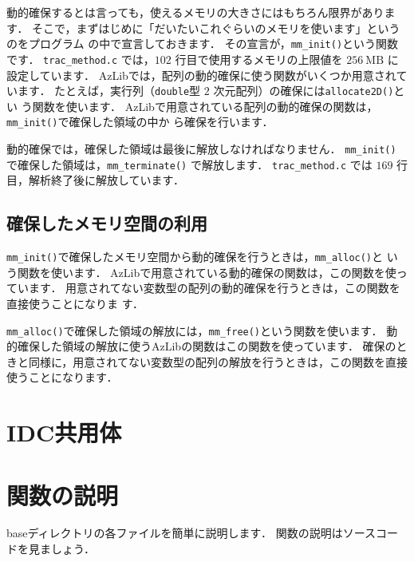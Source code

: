 動的確保するとは言っても，使えるメモリの大きさにはもちろん限界があります．
そこで，まずはじめに「だいたいこれぐらいのメモリを使います」というのをプログラム
の中で宣言しておきます．
その宣言が，\verb|mm_init()|という関数です．
\verb|trac_method.c| では，$102$ 行目で使用するメモリの上限値を 
$256 \ \mathrm{MB}$ に設定しています．
AzLibでは，配列の動的確保に使う関数がいくつか用意されています．
たとえば，実行列（\verb|double|型 $2$ 次元配列）の確保には\verb|allocate2D()|とい
う関数を使います．
AzLibで用意されている配列の動的確保の関数は，\verb|mm_init()|で確保した領域の中か
ら確保を行います．

動的確保では，確保した領域は最後に解放しなければなりません．
\verb|mm_init()| で確保した領域は，\verb|mm_terminate()| で解放します．
\verb|trac_method.c| では $169$ 行目，解析終了後に解放しています．

\subsection{確保したメモリ空間の利用}
\verb|mm_init()|で確保したメモリ空間から動的確保を行うときは，\verb|mm_alloc()|と
いう関数を使います．
AzLibで用意されている動的確保の関数は，この関数を使っています．
用意されてない変数型の配列の動的確保を行うときは，この関数を直接使うことになりま
す．

\verb|mm_alloc()|で確保した領域の解放には，\verb|mm_free()|という関数を使います．
動的確保した領域の解放に使うAzLibの関数はこの関数を使っています．
確保のときと同様に，用意されてない変数型の配列の解放を行うときは，この関数を直接
使うことになります．


\section{IDC共用体}


\section{関数の説明}
baseディレクトリの各ファイルを簡単に説明します．
関数の説明はソースコードを見ましょう．

